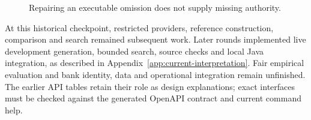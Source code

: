 \begin{figure}[H]
\centering
{}
\caption{Repairing an executable omission does not supply missing authority.}
\label{fig:encoding-repair-still-blocked}
\end{figure}

At this historical checkpoint, restricted providers, reference construction,
comparison and search remained subsequent work. Later rounds implemented live
development generation, bounded search, source checks and local Java integration,
as described in Appendix~\ref{app:current-interpretation}. Fair empirical
evaluation and bank identity, data and operational integration remain unfinished.
The earlier API tables retain their role as design explanations; exact interfaces
must be checked against the generated OpenAPI contract and current command help.

